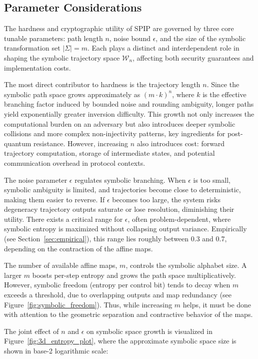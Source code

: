 \documentclass[twocolumn,10pt]{article}
\begin{document}
\subsection{Parameter Considerations}

The hardness and cryptographic utility of SPIP are governed by three core tunable parameters: path length $n$, noise bound $\epsilon$, and the size of the symbolic transformation set $|\Sigma| = m$. Each plays a distinct and interdependent role in shaping the symbolic trajectory space $\mathcal{W}_n$, affecting both security guarantees and implementation costs.

The most direct contributor to hardness is the trajectory length $n$. Since the symbolic path space grows approximately as $(m \cdot k)^n$, where $k$ is the effective branching factor induced by bounded noise and rounding ambiguity, longer paths yield exponentially greater inversion difficulty. This growth not only increases the computational burden on an adversary but also introduces deeper symbolic collisions and more complex non-injectivity patterns, key ingredients for post-quantum resistance. However, increasing $n$ also introduces cost: forward trajectory computation, storage of intermediate states, and potential communication overhead in protocol contexts.

The noise parameter $\epsilon$ regulates symbolic branching. When $\epsilon$ is too small, symbolic ambiguity is limited, and trajectories become close to deterministic, making them easier to reverse. If $\epsilon$ becomes too large, the system risks degeneracy trajectory outputs saturate or lose resolution, diminishing their utility. There exists a critical range for $\epsilon$, often problem-dependent, where symbolic entropy is maximized without collapsing output variance. Empirically (see Section~\ref{sec:empirical}), this range lies roughly between 0.3 and 0.7, depending on the contraction of the affine maps.

The number of available affine maps, $m$, controls the symbolic alphabet size. A larger $m$ boosts per-step entropy and grows the path space multiplicatively. However, symbolic freedom (entropy per control bit) tends to decay when $m$ exceeds a threshold, due to overlapping outputs and map redundancy (see Figure~\ref{fig:symbolic_freedom}). Thus, while increasing $m$ helps, it must be done with attention to the geometric separation and contractive behavior of the maps.

The joint effect of $n$ and $\epsilon$ on symbolic space growth is visualized in Figure~\ref{fig:3d_entropy_plot}, where the approximate symbolic space size is shown in base-2 logarithmic scale:
\end{document}
